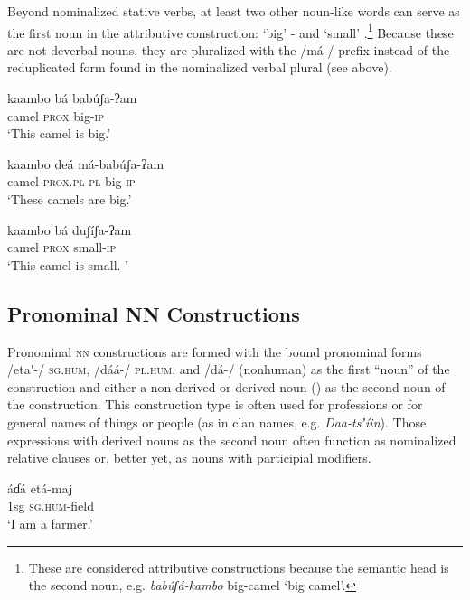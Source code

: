 \documentclass[output=paper]{langsci/langscibook}
\begin{document}
Beyond nominalized stative verbs, at least two other noun-like words can serve as the first noun in the attributive construction: ‘big’ - and ‘small’ .\footnote{These are considered attributive constructions because the semantic head is the second noun, e.g. \textit{bab\'{u}ʃ\'{a}-kambo} big-camel ‘big camel’.} Because these are not deverbal nouns, they are pluralized with the /m\'{a}-/ prefix  instead of the reduplicated form found in the nominalized verbal plural (see  above).

\ea\label{ex:ahlandc:52}
\gll
kaambo b\'{a}      bab\'{u}ʃa-ʔam  \\
camel    \textsc{prox}  big-\textsc{ip} \\
\glt
‘This camel is big.’
\z

\ea\label{ex:ahlandc:53}
\gll
kaambo de\'{a}          m\'{a}-bab\'{u}ʃa-ʔam   \\
camel    \textsc{prox.pl}  \textsc{pl-}big\textsc{{}-ip} \\
\glt
‘These camels are big.’
\z

\ea\label{ex:ahlandc:54}
\gll
kaambo b\'{a}  duʃ\'{i}ʃa-ʔam  \\
camel    \textsc{prox}  small-\textsc{ip} \\
\glt
‘This camel is small. ’
\z

\subsection{Pronominal NN Constructions}\label{sec:ahlandc:8.3}

Pronominal \textsc{nn} constructions are formed with the bound pronominal forms /eta\'{ }{}-/ \textsc{sg.hum}, /d\'{a}\'{a}-/ \textsc{pl.hum}, and /d\'{a}-/ (nonhuman) as the first “noun” of the construction and either a non-derived  or derived noun () as the second noun of the construction. This construction type is often used for professions  or for general names of things or people (as in clan names, e.g. \textit{Daa-ts}\textit{ʼ\'{i}in}).   Those expressions with derived nouns as the second noun often function as nominalized relative clauses or, better yet, as nouns with participial modifiers. 

\ea\label{ex:ahlandc:55}
\ea\label{ex:ahlandc:55a}
\gll
\'{a}ɗ\'{a}  et\'{a}-maj   \\
  1sg  \textsc{sg.hum}{}-field\\
\glt
  ‘I am a farmer.’
\end{document}
